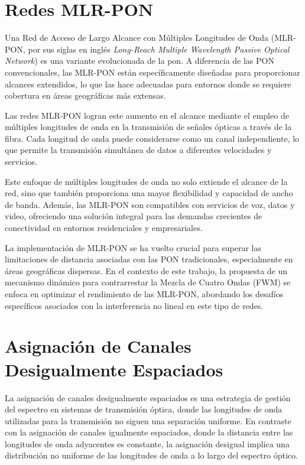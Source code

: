 \section{Redes MLR-PON}
Una Red de Acceso de Largo Alcance con Múltiples Longitudes de Onda (MLR-PON, por sus siglas en inglés \textit{Long-Reach Multiple Wavelength Passive Optical Network}) es una variante evolucionada de la \acrfull{pon}. A diferencia de las PON convencionales, las MLR-PON están específicamente diseñadas para proporcionar alcances extendidos, lo que las hace adecuadas para entornos donde se requiere cobertura en áreas geográficas más extensas.

Las redes MLR-PON logran este aumento en el alcance mediante el empleo de múltiples longitudes de onda en la transmisión de señales ópticas a través de la fibra. Cada longitud de onda puede considerarse como un canal independiente, lo que permite la transmisión simultánea de datos a diferentes velocidades y servicios.

Este enfoque de múltiples longitudes de onda no solo extiende el alcance de la red, sino que también proporciona una mayor flexibilidad y capacidad de ancho de banda. Además, las MLR-PON son compatibles con servicios de voz, datos y video, ofreciendo una solución integral para las demandas crecientes de conectividad en entornos residenciales y empresariales.

La implementación de MLR-PON se ha vuelto crucial para superar las limitaciones de distancia asociadas con las PON tradicionales, especialmente en áreas geográficas dispersas. En el contexto de este trabajo, la propuesta de un mecanismo dinámico para contrarrestar la Mezcla de Cuatro Ondas (FWM) se enfoca en optimizar el rendimiento de las MLR-PON, abordando los desafíos específicos asociados con la interferencia no lineal en este tipo de redes.


\section{Asignación de Canales Desigualmente Espaciados}
La asignación de canales desigualmente espaciados es una estrategia de gestión del espectro en sistemas de transmisión óptica, donde las longitudes de onda utilizadas para la transmisión no siguen una separación uniforme. En contraste con la asignación de canales igualmente espaciados, donde la distancia entre las longitudes de onda adyacentes es constante, la asignación desigual implica una distribución no uniforme de las longitudes de onda a lo largo del espectro óptico.

